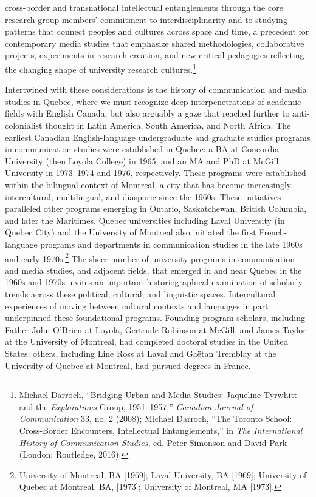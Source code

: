 \documentclass{tufte-handout}
\begin{document}
cross-border and transnational intellectual entanglements through the
core research group members' commitment to interdisciplinarity and to
studying patterns that connect peoples and cultures across space and
time, a precedent for contemporary media studies that emphasize shared
methodologies, collaborative projects, experiments in research-creation,
and new critical pedagogies reflecting the changing shape of university
research cultures.\footnote{Michael Darroch, ``Bridging Urban and Media
  Studies: Jaqueline Tyrwhitt and the \emph{Explorations} Group,
  1951--1957,'' \emph{Canadian Journal of Communication} 33, no. 2
  (2008); Michael Darroch, ``The Toronto School: Cross-Border
  Encounters, Intellectual Entanglements,'' in \emph{The International
  History of Communication Studies}, ed. Peter Simonson and David Park
  (London: Routledge, 2016).}

Intertwined with these considerations is the history of communication
and media studies in Quebec, where we must recognize deep
interpenetrations of academic fields with English Canada, but also
arguably a gaze that reached further to anti-colonialist thought in
Latin America, South America, and North Africa. The earliest Canadian
English-language undergraduate and graduate studies programs in
communication studies were established in Quebec: a BA at Concordia
University (then Loyola College) in 1965, and an MA and PhD at McGill
University in 1973--1974 and 1976, respectively. These programs were
established within the bilingual context of Montreal, a city that has
become increasingly intercultural, multilingual, and diasporic since the
1960s. These initiatives paralleled other programs emerging in Ontario,
Saskatchewan, British Columbia, and later the Maritimes. Quebec
universities including Laval University (in Quebec City) and the
University of Montreal also initiated the first French-language programs
and departments in communication studies in the late 1960s and early
1970s.\footnote{University of Montreal, BA {[}1969{]}; Laval University,
  BA {[}1969{]}; University of Quebec at Montreal, BA, {[}1973{]};
  University of Montreal, MA {[}1973{]}.} The sheer number of university
programs in communication and media studies, and adjacent fields, that
emerged in and near Quebec in the 1960s and 1970s invites an important
historiographical examination of scholarly trends across these
political, cultural, and linguistic spaces. Intercultural experiences of
moving between cultural contexts and languages in part underpinned these
foundational programs. Founding program scholars, including Father John
O'Brien at Loyola, Gertrude Robinson at McGill, and James Taylor at the
University of Montreal, had completed doctoral studies in the United
States; others, including Line Ross at Laval and Gaëtan Tremblay at the
University of Quebec at Montreal, had pursued degrees in France.
\end{document}

